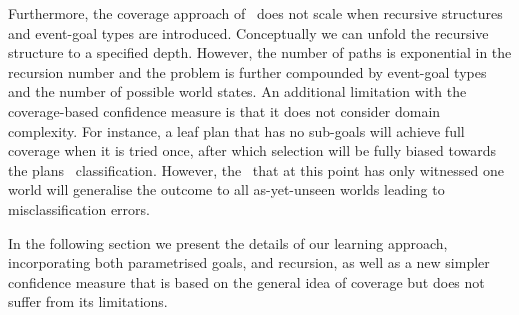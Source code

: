 
Furthermore, the coverage approach of~\cite{Singh:AAMAS10} does not scale
when recursive structures and event-goal types are
introduced. Conceptually we can unfold the recursive structure to a
specified depth. However, the number of paths is exponential in the
recursion number and the problem is further compounded by event-goal
types and the number of possible world states.
%
An additional limitation with the
coverage-based confidence measure is that it does not consider domain
complexity. For instance, a leaf plan that has no sub-goals will
achieve full coverage when it is tried once, after which selection
will be fully biased towards the plans \dt\ classification. However,
the \dt\ that at this point has only witnessed one world will
generalise the outcome to all as-yet-unseen worlds leading to
misclassification errors. 

In the following section we present the details of our learning
approach, incorporating both parametrised goals, and recursion, as
well as a new simpler confidence measure that is based on the 
general idea of coverage but does not suffer from its limitations.







